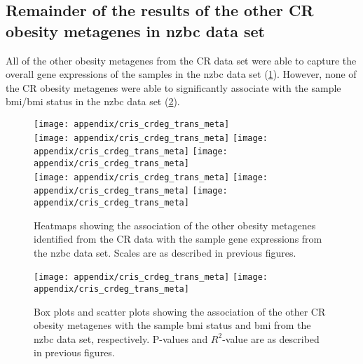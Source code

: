 \begin{appendices}
	\section{Remainder of the results of the other CR obesity metagenes in \gls{nzbc} data set}
	\label{sec:rest_of_the_cr_ob_meta_heatmap_results_cris}

	All of the other obesity metagenes from the CR data set were able to capture the overall gene expressions of the samples in the \gls{nzbc} data set (\cref{fig:appendix/cr_ob_meta_heatmap_cris}).
	However, none of the CR obesity metagenes were able to significantly associate with the sample \gls{bmi}/\gls{bmi} status in the \gls{nzbc} data set (\cref{fig:appendix/cr_ob_meta_box_scatter_cris}).

	\begin{figure}[htp!]
		\centering
		\texttt{[image: appendix/cris\_crdeg\_trans\_meta]}\\
		\texttt{[image: appendix/cris\_crdeg\_trans\_meta]}
		\texttt{[image: appendix/cris\_crdeg\_trans\_meta]}
		\texttt{[image: appendix/cris\_crdeg\_trans\_meta]}\\
		\texttt{[image: appendix/cris\_crdeg\_trans\_meta]}
		\texttt{[image: appendix/cris\_crdeg\_trans\_meta]}
		\texttt{[image: appendix/cris\_crdeg\_trans\_meta]}\\
		\caption[Association of the other CR obesity metagenes with the sample gene expressions in the \gls{nzbc} data]{Heatmaps showing the association of the other obesity metagenes identified from the CR data with the sample gene expressions from the \gls{nzbc} data set.
		Scales are as described in previous figures.}
		\label{fig:appendix/cr_ob_meta_heatmap_cris}
	\end{figure}

	\begin{figure}[htpb]
		\centering
		\texttt{[image: appendix/cris\_crdeg\_trans\_meta]}
		\hfill
		\texttt{[image: appendix/cris\_crdeg\_trans\_meta]}\\
		\caption[Association of the other CR obesity metagenes with the sample \gls{bmi}/\gls{bmi} status in the \gls{nzbc} data]{Box plots and scatter plots showing the association of the other CR obesity metagenes with the sample \gls{bmi} status  and \gls{bmi} from the \gls{nzbc} data set, respectively.
		P-values and $R^2$-value are as described in previous figures.}
		\label{fig:appendix/cr_ob_meta_box_scatter_cris}
	\end{figure}


\end{appendices}

